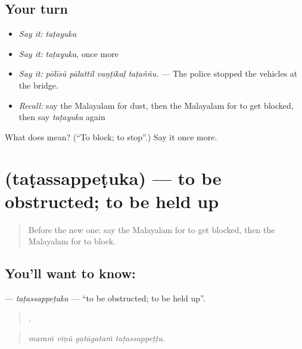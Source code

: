 \subsection*{Your turn}
\begin{itemize}
\raggedright
  \item \emph{Say it:} \emph{taṭayuka}
  \item \emph{Say it:} \emph{taṭayuka}, once more
  \item \emph{Say it:} \emph{pōlīsŭ pālattil vaṇṭikaḷ taṭaññu.} — The police stopped the vehicles at the bridge.
  \item \emph{Recall:} say the Malayalam for dust, then the Malayalam for to get blocked, then say \emph{taṭayuka} again
\end{itemize}

\begin{tcolorbox}[breakable,colback=teal!4,colframe=teal!35!black,title={Before you move on}]
What does  mean? (\textquotedblleft{}To block; to stop\textquotedblright{}.) Say it once more.
\end{tcolorbox}
\section[\texorpdfstring{\ml{തടസ്സപ്പെടുക} (taṭassappeṭuka)}{തടസ്സപ്പെടുക (taṭassappeṭuka)}]{ (taṭassappeṭuka) — to be obstructed; to be held up}

\label{lesson:ML-C516-tatassappetuka}



\begin{quote}
Before the new one: say the Malayalam for to get blocked, then the Malayalam for to block.
\end{quote}

\subsection*{You'll want to know: }
\textbf{} — \emph{taṭassappeṭuka} — \textquotedblleft{}to be obstructed; to be held up\textquotedblright{}.

\begin{quote}
   .
\end{quote}

\begin{quote}
\emph{maraṁ vīṇŭ gatāgataṁ taṭassappeṭṭu.}
\end{quote}

